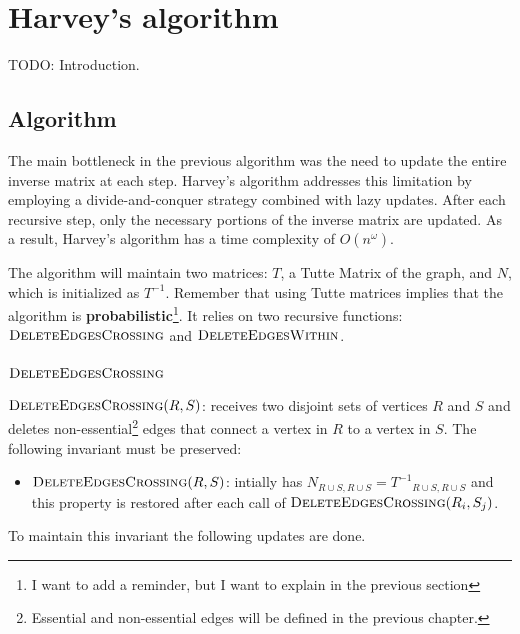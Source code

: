 \chapter{Harvey's algorithm}

TODO: Introduction.



\section{Algorithm}

The main bottleneck in the previous algorithm was the need to update the entire inverse matrix at each step. 
Harvey's algorithm addresses this limitation by employing a divide-and-conquer strategy combined with lazy updates. 
After each recursive step, only the necessary portions of the inverse matrix are updated.
As a result, Harvey's algorithm has a time complexity of \(O(n^\omega)\).

The algorithm will maintain two matrices: \(T\), a Tutte Matrix of the graph, and \(N\), which is initialized as \(T^{-1}\).
Remember that using Tutte matrices implies that the algorithm is \textbf{probabilistic}\footnote{I want to add a reminder, but I want to explain in the previous section}.
It relies on two recursive functions: \(\textsc{DeleteEdgesCrossing}\) and \(\textsc{DeleteEdgesWithin}\). 

\subsection{\(\textsc{DeleteEdgesCrossing}\)}

$\textsc{DeleteEdgesCrossing}(R, S)$: receives two disjoint sets of vertices \(R\) and \(S\) and 
deletes non-essential\footnote{Essential and non-essential edges will be defined in the previous chapter.} 
edges that connect a vertex in \(R\) to a vertex in \(S\).
The following invariant must be preserved:
\begin{itemize}
    \item \(\textsc{DeleteEdgesCrossing}(R, S)\): intially has \(N_{R \cup S, R \cup S} = {T^{-1}}_{R \cup S, R \cup S}\) and this property is restored after each call 
    of \(\textsc{DeleteEdgesCrossing}(R_i, S_j)\).
\end{itemize}
To maintain this invariant the following updates are done. 

